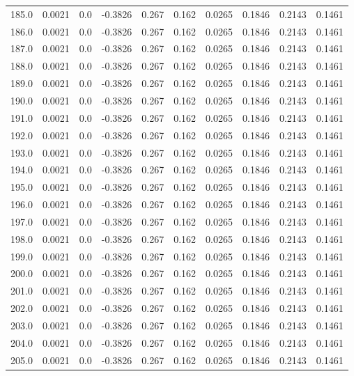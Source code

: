 \begin{longtable}{lrrrrrrrrr}
185.0 & 0.0021 & 0.0 & -0.3826 & 0.267 & 0.162 & 0.0265 & 0.1846 & 0.2143 & 0.1461 \\
186.0 & 0.0021 & 0.0 & -0.3826 & 0.267 & 0.162 & 0.0265 & 0.1846 & 0.2143 & 0.1461 \\
187.0 & 0.0021 & 0.0 & -0.3826 & 0.267 & 0.162 & 0.0265 & 0.1846 & 0.2143 & 0.1461 \\
188.0 & 0.0021 & 0.0 & -0.3826 & 0.267 & 0.162 & 0.0265 & 0.1846 & 0.2143 & 0.1461 \\
189.0 & 0.0021 & 0.0 & -0.3826 & 0.267 & 0.162 & 0.0265 & 0.1846 & 0.2143 & 0.1461 \\
190.0 & 0.0021 & 0.0 & -0.3826 & 0.267 & 0.162 & 0.0265 & 0.1846 & 0.2143 & 0.1461 \\
191.0 & 0.0021 & 0.0 & -0.3826 & 0.267 & 0.162 & 0.0265 & 0.1846 & 0.2143 & 0.1461 \\
192.0 & 0.0021 & 0.0 & -0.3826 & 0.267 & 0.162 & 0.0265 & 0.1846 & 0.2143 & 0.1461 \\
193.0 & 0.0021 & 0.0 & -0.3826 & 0.267 & 0.162 & 0.0265 & 0.1846 & 0.2143 & 0.1461 \\
194.0 & 0.0021 & 0.0 & -0.3826 & 0.267 & 0.162 & 0.0265 & 0.1846 & 0.2143 & 0.1461 \\
195.0 & 0.0021 & 0.0 & -0.3826 & 0.267 & 0.162 & 0.0265 & 0.1846 & 0.2143 & 0.1461 \\
196.0 & 0.0021 & 0.0 & -0.3826 & 0.267 & 0.162 & 0.0265 & 0.1846 & 0.2143 & 0.1461 \\
197.0 & 0.0021 & 0.0 & -0.3826 & 0.267 & 0.162 & 0.0265 & 0.1846 & 0.2143 & 0.1461 \\
198.0 & 0.0021 & 0.0 & -0.3826 & 0.267 & 0.162 & 0.0265 & 0.1846 & 0.2143 & 0.1461 \\
199.0 & 0.0021 & 0.0 & -0.3826 & 0.267 & 0.162 & 0.0265 & 0.1846 & 0.2143 & 0.1461 \\
200.0 & 0.0021 & 0.0 & -0.3826 & 0.267 & 0.162 & 0.0265 & 0.1846 & 0.2143 & 0.1461 \\
201.0 & 0.0021 & 0.0 & -0.3826 & 0.267 & 0.162 & 0.0265 & 0.1846 & 0.2143 & 0.1461 \\
202.0 & 0.0021 & 0.0 & -0.3826 & 0.267 & 0.162 & 0.0265 & 0.1846 & 0.2143 & 0.1461 \\
203.0 & 0.0021 & 0.0 & -0.3826 & 0.267 & 0.162 & 0.0265 & 0.1846 & 0.2143 & 0.1461 \\
204.0 & 0.0021 & 0.0 & -0.3826 & 0.267 & 0.162 & 0.0265 & 0.1846 & 0.2143 & 0.1461 \\
205.0 & 0.0021 & 0.0 & -0.3826 & 0.267 & 0.162 & 0.0265 & 0.1846 & 0.2143 & 0.1461 \\

\end{longtable}
